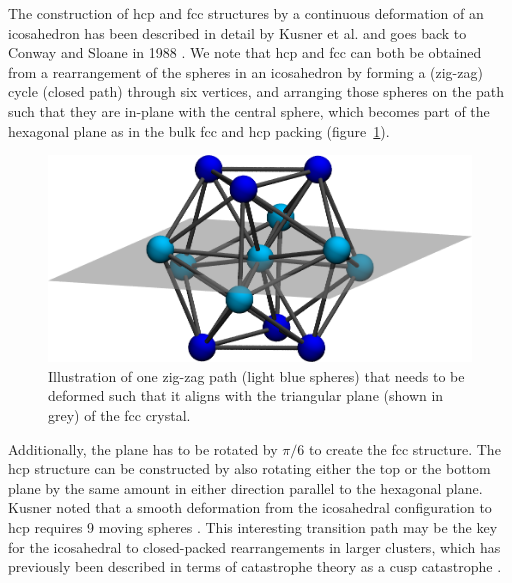 The construction of hcp and fcc structures by a continuous deformation of an
icosahedron has been described in detail by Kusner et al.
\autocite{Kusner_ConfigurationSpacesEqual_2018} and goes back to Conway and Sloane
in 1988 \autocite{Conway_SpherePackingsLattices_1999}. We note that hcp and fcc can both be obtained
from a rearrangement of the spheres in an icosahedron by forming a (zig-zag)
cycle (closed path) through six vertices, and arranging those spheres on the
path such that they are in-plane with the central sphere, which becomes part of
the hexagonal plane as in the bulk fcc and hcp packing
(figure~\ref{fig:ico-fcc-trans}).
\begin{figure}[htb]
    \centering
    \includegraphics[width=.8\columnwidth]{gregory-newton/plane.png}
    \caption{Illustration of one zig-zag path (light blue spheres) that needs
    to be deformed such that it aligns with the triangular plane (shown in
    grey) of the fcc crystal.}
    \label{fig:ico-fcc-trans}
\end{figure}
Additionally, the plane has to be rotated by $\pi/6$ to create the fcc
structure. The hcp structure can be constructed by also rotating either the top
or the bottom plane by the same amount in either direction parallel to the
hexagonal plane. Kusner noted that a smooth deformation from the icosahedral
configuration to hcp requires 9 moving spheres
\autocite{Kusner_ConfigurationSpacesEqual_2018}. This interesting transition path
may be the key for the icosahedral to closed-packed rearrangements in larger
clusters, which has previously been described in terms of catastrophe theory as
a cusp catastrophe \autocite{Wales_MicroscopicBasisGlobal_2001}. 

